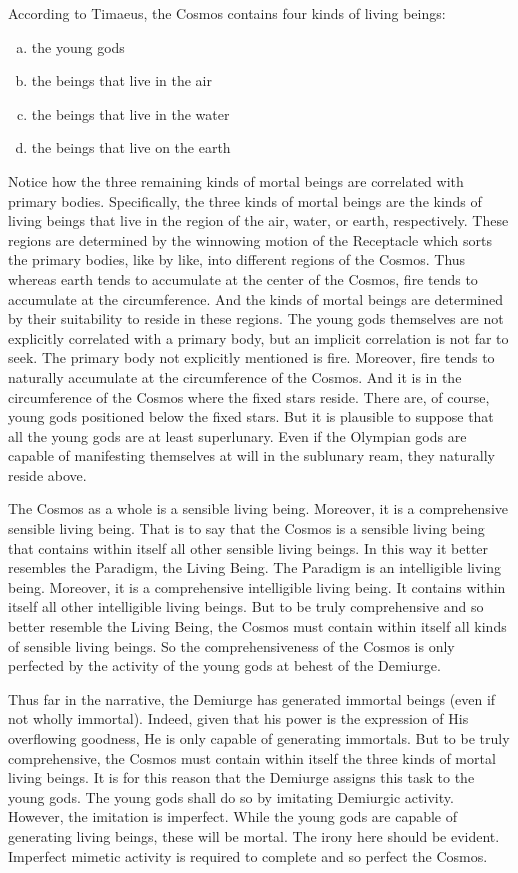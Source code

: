 According to Timaeus, the Cosmos contains four kinds of living beings:
\begin{enumerate}[(a)]
	\item the young gods
	\item the beings that live in the air
	\item the beings that live in the water
	\item the beings that live on the earth
\end{enumerate}
Notice how the three remaining kinds of mortal beings are correlated with primary bodies. Specifically, the three kinds of mortal beings are the kinds of living beings that live in the region of the air, water, or earth, respectively. These regions are determined by the winnowing motion of the Receptacle which sorts the primary bodies, like by like, into different regions of the Cosmos. Thus whereas earth tends to accumulate at the center of the Cosmos, fire tends to accumulate at the circumference. And the kinds of mortal beings are determined by their suitability to reside in these regions. The young gods themselves are not explicitly correlated with a primary body, but an implicit correlation is not far to seek. The primary body not explicitly mentioned is fire. Moreover, fire tends to naturally accumulate at the circumference of the Cosmos. And it is in the circumference of the Cosmos where the fixed stars reside. There are, of course, young gods positioned below the fixed stars. But it is plausible to suppose that all the young gods are at least superlunary. Even if the Olympian gods are capable of manifesting themselves at will in the sublunary ream, they naturally reside above.

The Cosmos as a whole is a sensible living being. Moreover, it is a comprehensive sensible living being. That is to say that the Cosmos is a sensible living being that contains within itself all other sensible living beings. In this way it better resembles the Paradigm, the Living Being. The Paradigm is an intelligible living being. Moreover, it is a comprehensive intelligible living being. It contains within itself all other intelligible living beings. But to be truly comprehensive and so better resemble the Living Being, the Cosmos must contain within itself all kinds of sensible living beings. So the comprehensiveness of the Cosmos is only perfected by the activity of the young gods at behest of the Demiurge.

Thus far in the narrative, the Demiurge has generated immortal beings (even if not wholly immortal). Indeed, given that his power is the expression of His overflowing goodness, He is only capable of generating immortals. But to be truly comprehensive, the Cosmos must contain within itself the three kinds of mortal living beings. It is for this reason that the Demiurge assigns this task to the young gods. The young gods shall do so by imitating Demiurgic activity. However, the imitation is imperfect. While the young gods are capable of generating living beings, these will be mortal. The irony here should be evident. Imperfect mimetic activity is required to complete and so perfect the Cosmos.

